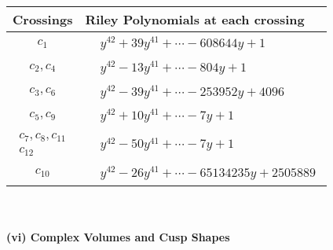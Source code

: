 \documentclass[1p]{elsarticle_modified}
\theoremstyle{definition}
\begin{document}
\begin{tabular}{m{50pt}|m{274pt}}
Crossings & \hspace{64pt}Riley Polynomials at each crossing \\
\hline $$\begin{aligned}c_{1}\end{aligned}$$&$\begin{aligned}
&y^{42}+39 y^{41}+\cdots-608644 y+1
\end{aligned}$\\
\hline $$\begin{aligned}c_{2},c_{4}\end{aligned}$$&$\begin{aligned}
&y^{42}-13 y^{41}+\cdots-804 y+1
\end{aligned}$\\
\hline $$\begin{aligned}c_{3},c_{6}\end{aligned}$$&$\begin{aligned}
&y^{42}-39 y^{41}+\cdots-253952 y+4096
\end{aligned}$\\
\hline $$\begin{aligned}c_{5},c_{9}\end{aligned}$$&$\begin{aligned}
&y^{42}+10 y^{41}+\cdots-7 y+1
\end{aligned}$\\
\hline $$\begin{aligned}c_{7},c_{8},c_{11}\\c_{12}\end{aligned}$$&$\begin{aligned}
&y^{42}-50 y^{41}+\cdots-7 y+1
\end{aligned}$\\
\hline $$\begin{aligned}c_{10}\end{aligned}$$&$\begin{aligned}
&y^{42}-26 y^{41}+\cdots-65134235 y+2505889
\end{aligned}$\\
\hline
\end{tabular}\\~\\
\newpage\flushleft \textbf{(vi) Complex Volumes and Cusp Shapes}
\end{document}
